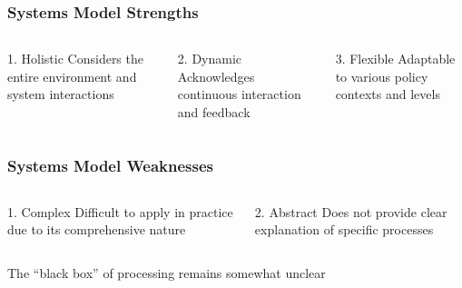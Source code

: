 \documentclass[10pt]{beamer}
\begin{document}
\begin{frame}
\frametitle{Systems Model Strengths}

\begin{columns}
\begin{column}{0.32\textwidth}
\begin{block}{1. Holistic}
\pause
Considers the entire environment and system interactions
\end{block}
\end{column}

\begin{column}{0.32\textwidth}
\begin{block}{2. Dynamic}
\pause
Acknowledges continuous interaction and feedback
\end{block}
\end{column}

\begin{column}{0.32\textwidth}
\begin{block}{3. Flexible}
\pause
Adaptable to various policy contexts and levels
\end{block}
\end{column}
\end{columns}

\end{frame}

\begin{frame}
\frametitle{Systems Model Weaknesses}

\begin{columns}
\begin{column}{0.48\textwidth}
\begin{alertblock}{1. Complex}
\pause
Difficult to apply in practice due to its comprehensive nature
\end{alertblock}
\end{column}

\begin{column}{0.48\textwidth}
\begin{alertblock}{2. Abstract}
\pause
Does not provide clear explanation of specific processes
\end{alertblock}
\end{column}
\end{columns}

\pause
\vspace{0.5cm}
\centering
The ``black box'' of processing remains somewhat unclear

\end{frame}
\end{document}
